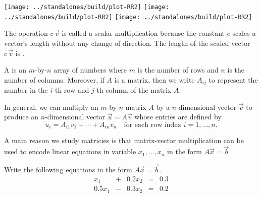 \documentclass[../main.tex]{subfiles}
\begin{document}
\begin{itemize}[wide]
    \texttt{[image: ../standalones/build/plot-RR2]}
    \quad
    \texttt{[image: ../standalones/build/plot-RR2]}
    \quad
    \texttt{[image: ../standalones/build/plot-RR2]}

    The operation \(c \, \vec{v}\) is called a scalar-multiplication because the constant \(c\) scales a vector's length without any change of direction.  The length of the scaled vector \(c \, \vec{v}\) is \underline{\hspace{2in}\phantom{\huge X}}.

\end{itemize}
\clearpage

A  is an \(m\)-by-\(n\) array of numbers where \(m\) is the number of rows and \(n\) is the number of columns.  Moreover, if \(A\) is a matrix, then we write \(A_{ij}\) to represent the number in the \(i\)-th row and \(j\)-th column of the matrix \(A\). 

In general, we can multiply an \(m\)-by-\(n\) matrix \(A\) by a \(n\)-dimensional vector \(\vec{v}\) to produce an \(n\)-dimensional vector \(\vec{u} = A\vec{v}\) whose entries are defined by
\[
  u_{i} = A_{i1} v_{1} + \cdots + A_{in} v_{n} 
  \quad\text{for each row index \(i = 1, \ldots, n\)}.
\]

A main reason we study matricies is that matrix-vector multiplication can be used to encode linear equations in variable \(x_{1}, \ldots, x_{n}\) in the form \(A \vec{x} = \vec{b}\). 

\begin{example}
  Write the following equations in the form \(A \vec{x} = \vec{b}\).
  \[
    \begin{array}{rcrcr}
      x_{1} &+& 0.2 x_{2} &=& 0.3 \\
      0.5 x_{1} &-& 0.3 x_{2} &=& 0.2
    \end{array}
  \]
\end{example}
\end{document}
